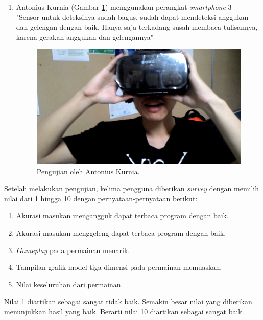 \begin{enumerate}
    \item Antonius Kurnia (Gambar \ref{fig:pengujian_antonius_kurnia}) menggunakan perangkat \textit{smartphone} 3\\
    
    "Sensor untuk deteksinya sudah bagus, sudah dapat mendeteksi anggukan dan gelengan dengan baik. Hanya saja terkadang susah membaca tulisannya, karena gerakan anggukan dan gelengannya"
    
    \begin{figure}[htbp]
    \centering
    \includegraphics[scale=0.3]{Gambar/PengujianEksperimental/AntoniusKurnia.png}
    \caption{Pengujian oleh Antonius Kurnia.} 
    \label{fig:pengujian_antonius_kurnia}
    \end{figure}
    
\end{enumerate}

Setelah melakukan pengujian, kelima pengguna diberikan \textit{survey} dengan memilih nilai dari 1 hingga 10 dengan pernyataan-pernyataan berikut:

\begin{enumerate}
    \item Akurasi masukan mengangguk dapat terbaca program dengan baik.
    \item Akurasi masukan menggeleng dapat terbaca program dengan baik.
    \item \textit{Gameplay} pada permainan menarik.
    \item Tampilan grafik model tiga dimensi pada permainan memuaskan.
    \item Nilai keseluruhan dari permainan.
\end{enumerate}

Nilai 1 diartikan sebagai sangat tidak baik. Semakin besar nilai yang diberikan menunjukkan hasil yang baik. Berarti nilai 10 diartikan sebagai sangat baik.

